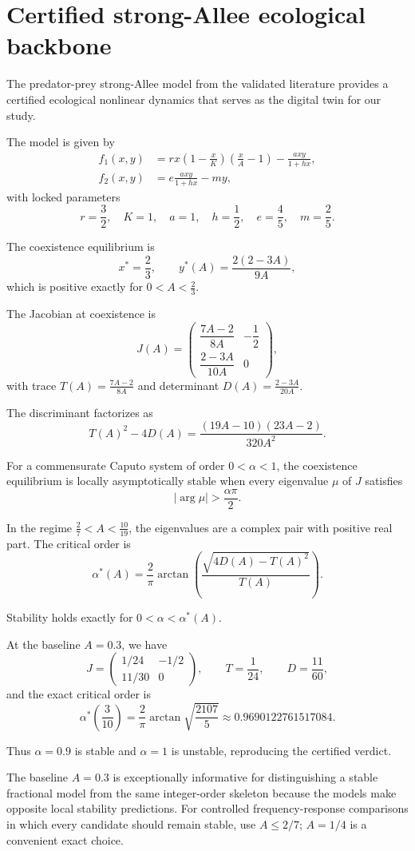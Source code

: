 \section{Certified strong-Allee ecological backbone}
\label{sec:backbone}

The predator-prey strong-Allee model from the validated literature provides a certified ecological nonlinear dynamics that serves as the digital twin for our study.

The model is given by
\begin{align}
    f_1(x,y) &= r x \left(1-\frac{x}{K}\right)\left(\frac{x}{A}-1\right)-\frac{axy}{1+hx}, \\
    f_2(x,y) &= e \frac{axy}{1+hx} - m y,
\end{align}
with locked parameters
\[
r=\frac{3}{2},\quad K=1,\quad a=1,\quad h=\frac{1}{2},\quad e=\frac{4}{5},\quad m=\frac{2}{5}.
\]

The coexistence equilibrium is
\[
x^* = \frac{2}{3}, \qquad y^*(A) = \frac{2(2-3A)}{9A},
\]
which is positive exactly for \(0<A<\frac{2}{3}\).

The Jacobian at coexistence is
\[
J(A) = \begin{pmatrix}
\dfrac{7A-2}{8A} & -\dfrac{1}{2} \\[1.2ex]
\dfrac{2-3A}{10A} & 0
\end{pmatrix},
\]
with trace \(T(A)=\frac{7A-2}{8A}\) and determinant \(D(A)=\frac{2-3A}{20A}\).

The discriminant factorizes as
\[
T(A)^2-4D(A) = \frac{(19A-10)(23A-2)}{320A^2}.
\]

For a commensurate Caputo system of order \(0<\alpha<1\), the coexistence equilibrium is locally asymptotically stable when every eigenvalue \(\mu\) of \(J\) satisfies
\[
|\arg\mu| > \frac{\alpha\pi}{2}.
\]

In the regime \(\frac{2}{7}<A<\frac{10}{19}\), the eigenvalues are a complex pair with positive real part. The critical order is
\[
\alpha^*(A) = \frac{2}{\pi} \arctan\left(\frac{\sqrt{4D(A)-T(A)^2}}{T(A)}\right).
\]

Stability holds exactly for \(0<\alpha<\alpha^*(A)\).

At the baseline \(A=0.3\), we have
\[
J=\begin{pmatrix}1/24 & -1/2 \\ 11/30 & 0\end{pmatrix},\qquad
T=\frac{1}{24},\qquad D=\frac{11}{60},
\]
and the exact critical order is
\[
\alpha^*\left(\frac{3}{10}\right) = \frac{2}{\pi}\arctan\sqrt{\frac{2107}{5}} \approx 0.9690122761517084.
\]

Thus \(\alpha=0.9\) is stable and \(\alpha=1\) is unstable, reproducing the certified verdict.

The baseline \(A=0.3\) is exceptionally informative for distinguishing a stable fractional model from the same integer-order skeleton because the models make opposite local stability predictions. For controlled frequency-response comparisons in which every candidate should remain stable, use \(A\le2/7\); \(A=1/4\) is a convenient exact choice.